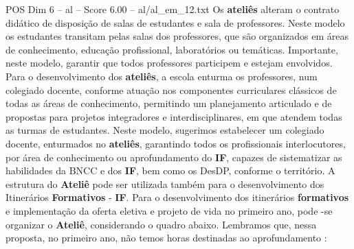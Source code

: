 \begin{textsample}{POS Dim 6 – al – Score 6.00 – al/al\_em\_12.txt}
Os \textbf{ateliês} alteram o contrato didático de disposição de salas de estudantes e sala de professores.
Neste modelo os estudantes transitam pelas salas dos professores, que são organizados em áreas de conhecimento, educação profissional, laboratórios ou temáticas.
Importante, neste modelo, garantir que todos professores participem e estejam envolvidos.
Para o desenvolvimento dos \textbf{ateliês}, a escola enturma os professores, num colegiado docente, conforme atuação nos componentes curriculares clássicos de todas as áreas de conhecimento, permitindo um planejamento articulado e de propostas para projetos integradores e interdisciplinares, em que atendem todas as turmas de estudantes.
Neste modelo, sugerimos estabelecer um colegiado docente, enturmados no \textbf{ateliês}, garantindo todos os profissionais interlocutores, por área de conhecimento ou aprofundamento do \textbf{IF}, capazes de sistematizar as habilidades da BNCC e dos \textbf{IF}, bem como os DesDP, conforme o território.
A estrutura do \textbf{Ateliê} pode ser utilizada também para o desenvolvimento dos Itinerários \textbf{Formativos} - \textbf{IF}.
Para o desenvolvimento dos itinerários \textbf{formativos} e implementação da oferta eletiva e projeto de vida no primeiro ano, pode -se organizar o \textbf{Ateliê}, considerando o quadro abaixo.
Lembramos que, nessa proposta, no primeiro ano, não temos horas destinadas ao aprofundamento :

\end{textsample}

